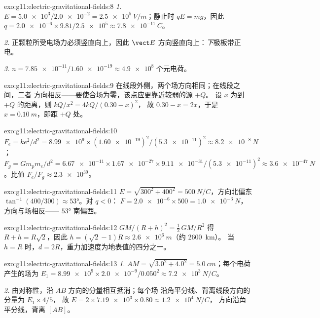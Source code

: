 \begin{solution}{exo:g11:electric-gravitational-fields:8}
\emph{1.} $E = \num{5.0e3} / \num{2.0e-2} = \qty{2.5e5}{V/m}$；静止时
$qE = mg$，因此
$q = \num{2.0e-6} \times 9.81 / \num{2.5e5} \approx \qty{7.8e-11}{C}$。

\emph{2.} 正颗粒所受电场力必须竖直向上，因此 $\vect E$
方向竖直向上：\emph{下}极板带正电。

\emph{3.} $n = \num{7.85e-11} / \num{1.60e-19} \approx \num{4.9e8}$
个元电荷。
\end{solution}

\begin{solution}{exo:g11:electric-gravitational-fields:9}
在线段外侧，两个场方向相同；在线段之间，二者
方向相反——要使合场为零，该点应更靠近较弱的源 $+Q$。
设 $x$ 为到 $+Q$ 的距离，则 $kQ/x^2 = 4kQ/(0.30 - x)^2$，
故 $0.30 - x = 2x$，于是 $x = \qty{0.10}{m}$，即距 $+Q$ 处。
\end{solution}

\begin{solution}{exo:g11:electric-gravitational-fields:10}
$F_e = ke^2/d^2 = \num{8.99e9} \times (\num{1.60e-19})^2 /
(\num{5.3e-11})^2 \approx \qty{8.2e-8}{N}$；
$F_g = G m_p m_e / d^2 = \num{6.67e-11} \times \num{1.67e-27} \times
\num{9.11e-31} / (\num{5.3e-11})^2 \approx \qty{3.6e-47}{N}$。比值
$F_e / F_g \approx \num{2.3e39}$。
\end{solution}

\begin{solution}{exo:g11:electric-gravitational-fields:11}
$E = \sqrt{300^2 + 400^2} = \qty{500}{N/C}$，方向北偏东
$\tan^{-1}(400/300) \approx \ang{53}$。对 $q < 0$：
$F = \num{2.0e-6} \times 500 = \qty{1.0e-3}{N}$，方向与场相反——
$\ang{53}$ 南偏西。
\end{solution}

\begin{solution}{exo:g11:electric-gravitational-fields:12}
$GM/(R+h)^2 = \tfrac12\,GM/R^2$ 得 $R + h = R\sqrt{2}$，因此
$h = (\sqrt{2} - 1)R \approx \qty{2.6e6}{m}$（约 \qty{2600}{km}）。
当 $h = R$ 时，$d = 2R$，重力加速度为地表值的四分之一。
\end{solution}

\begin{solution}{exo:g11:electric-gravitational-fields:13}
\emph{1.} $AM = \sqrt{3.0^2 + 4.0^2} = \qty{5.0}{cm}$；每个电荷
产生的场为 $E_1 = \num{8.99e9} \times \num{2.0e-9} / 0.050^2
\approx \qty{7.2e3}{N/C}$。

\emph{2.} 由对称性，沿 $AB$ 方向的分量相互抵消；每个场
沿角平分线、背离线段方向的分量为 $E_1 \times 4/5$，
故 $E = 2 \times \num{7.19e3} \times 0.80 \approx \qty{1.2e4}{N/C}$，
方向沿角平分线，背离 $[AB]$。
\end{solution}

